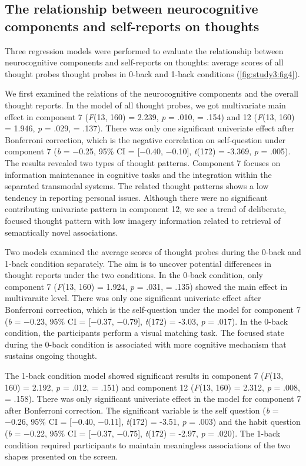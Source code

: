 \subsection{The relationship between neurocognitive components and self-reports on thoughts}
\label{study3:results:group}

Three regression models were performed to evaluate the relationship between neurocognitive components and self-reports on thoughts: average scores of all thought probes thought probes in 0-back and 1-back conditions (\cref{fig:study3:fig4}). 

We first examined the relations of the neurocognitive components and the overall thought reports. In the model of all thought probes, we got multivariate main effect in component 7 (\textit{F}(13, 160) = 2.239, \textit{p} = .010, \paretasquared = .154)
and 12 (\textit{F}(13, 160) = 1.946, \textit{p} = .029, \paretasquared = .137). There was only one significant univeriate effect after Bonferroni correction, which is the negative correlation on self-question under component 7 
(\textit{b} = −0.25, 95\% CI = [−0.40, −0.10], \textit{t}(172) = -3.369, \textit{p} = .005). The results revealed two types of thought patterns. Component 7 focuses on information maintenance in cognitive tasks and the integration within the separated transmodal systems. The related thought patterns shows a low tendency in reporting personal issues. Although there were no significant contributing univariate pattern in component 12, we see a trend of deliberate, focused thought pattern with low imagery information related to retrieval of semantically novel associations.

Two models examined the average scores of thought probes during the 0-back and 1-back condition separately.  The aim is to uncover potential differences in thought reports under the two conditions. In the 0-back condition, only component 7
(\textit{F}(13, 160) = 1.924, \textit{p} = .031, \paretasquared = .135)
showed the main effect in multivaraite level. There was only one significant univeriate effect after Bonferroni correction, which is the self-question under the model for component 7 
(\textit{b} = −0.23, 95\% CI = [−0.37, −0.79], \textit{t}(172) = -3.03, \textit{p} = .017).
In the 0-back condition, the participants perform a visual matching task. The focused state during the 0-back condition is associated with more cognitive mechanism that sustains ongoing thought. 

The 1-back condition model showed significant results in
component 7
(\textit{F}(13, 160) = 2.192, \textit{p} = .012, \paretasquared = .151)
and component 12
(\textit{F}(13, 160) = 2.312, \textit{p} = .008, \paretasquared = .158). There was only significant univeriate effect in the model for component 7 after Bonferroni correction.
The significant variable is the self question
(\textit{b} = −0.26, 95\% CI = [−0.40, −0.11], \textit{t}(172) = -3.51, \textit{p} = .003)
and the habit question
(\textit{b} = −0.22, 95\% CI = [−0.37, −0.75], \textit{t}(172) = -2.97, \textit{p} = .020).
The 1-back condition required participants to maintain meaningless associations of the two shapes presented on the screen.


